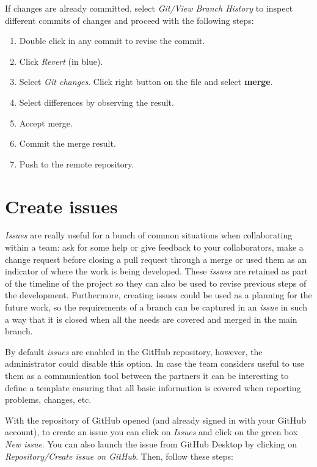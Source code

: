 If changes are already committed, select   \textit{Git/View Branch History}
to inspect different commits of changes and proceed with the following steps: 
\begin{enumerate}
 \setlength\itemsep{0.0cm}
\item Double click in any commit to revise the commit.
\item Click \textit{Revert} (in blue). 
\item Select \textit{Git changes}.  Click right button on the file and select {\bf merge}.
\item Select differences by observing the result. 
\item Accept merge. 
\item Commit the merge result. 
\item Push to the remote repository. 
\end{enumerate} 



\section{Create issues}

\textit{Issues} are really useful for a bunch of common situations when collaborating within a team: ask for some help or give feedback to your collaborators, make a change request before closing a pull request through a merge or used them as an indicator of where the work is being developed. These \textit{issues} are retained as part of the timeline of the project so they can also be used to revise previous steps of the development. Furthermore, creating issues could be used as a planning for the future work, so the requirements of a branch can be captured in an \textit{issue} in such a way that it is closed when all the needs are covered and merged in the main branch. 

By default \textit{issues} are enabled in the GitHub repository, however, the administrator could disable this option. 
In case the team considers useful to use them as a communication tool between the partners it can be interesting 
to define a template ensuring that all basic information is covered when reporting problems, changes, etc.

With the repository of GitHub opened (and already signed in with your GitHub account), to create an issue you can click on \textit{Issues} and click on the green box \textit{New issue}. 
You can also launch the issue from GitHub Desktop by clicking on \textit{Repository/Create issue on GitHub}. 
Then, follow these steps:

